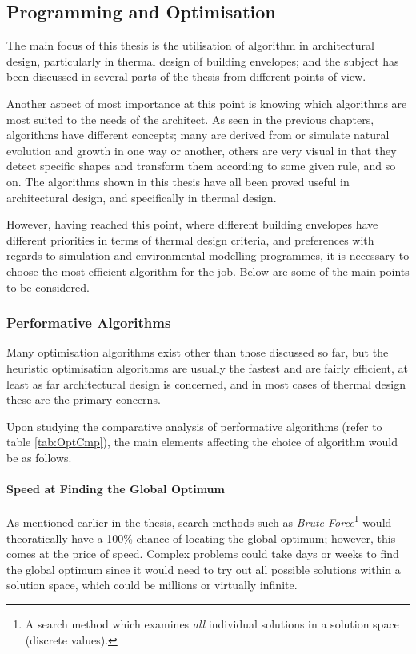 \clearpage
\subsection{Programming and Optimisation}

The main focus of this thesis is the utilisation of algorithm in architectural design, particularly in thermal design of building envelopes; and the subject has been discussed in several parts of the thesis from different points of view.

Another aspect of most importance at this point is knowing which algorithms are most suited to the needs of the architect. As seen in the previous chapters, algorithms have different concepts; many are derived from or simulate natural evolution and growth in one way or another, others are very visual in that they detect specific shapes and transform them according to some given rule, and so on. The algorithms shown in this thesis have all been proved useful in architectural design, and specifically in thermal design.

However, having reached this point, where different building envelopes have different priorities in terms of thermal design criteria, and preferences with regards to simulation and environmental modelling programmes, it is necessary to choose the most efficient algorithm for the job. Below are some of the main points to be considered.

\subsubsection{Performative Algorithms}

Many optimisation algorithms exist other than those discussed so far, but the heuristic optimisation algorithms are usually the fastest and are fairly efficient, at least as far architectural design is concerned, and in most cases of thermal design these are the primary concerns.

Upon studying the comparative analysis of performative algorithms (refer to table \ref{tab:OptCmp}), the main elements affecting the choice of algorithm would be as follows.

\paragraph{Speed at Finding the Global Optimum}\mbox{}\vspace{-0.4cm}

As mentioned earlier in the thesis, search methods such as \emph{Brute Force}\footnote{A search method which examines \emph{all} individual solutions in a solution space (discrete values).} would theoratically have a 100\% chance of locating the global optimum; however, this comes at the price of speed. Complex problems could take days or weeks to find the global optimum since it would need to try out all possible solutions within a solution space, which could be millions or virtually infinite.

